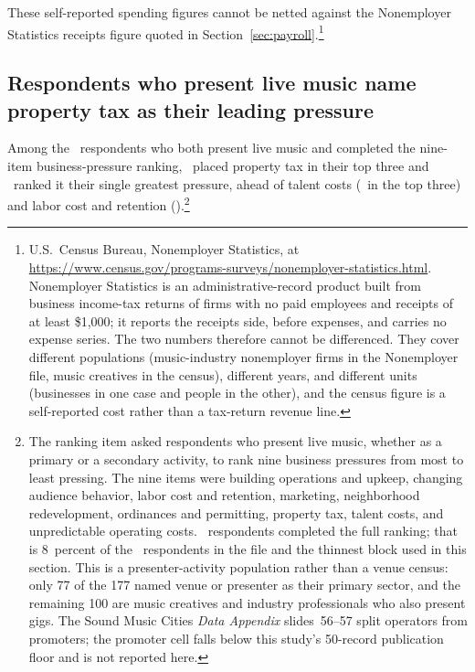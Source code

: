 These self-reported spending figures cannot be netted against the
Nonemployer Statistics receipts figure quoted in
Section~\ref{sec:payroll}.\footnote{U.S.~Census Bureau, Nonemployer
Statistics, at
\url{https://www.census.gov/programs-surveys/nonemployer-statistics.html}.
Nonemployer Statistics is an administrative-record product built from
business income-tax returns of firms with no paid employees and receipts of
at least \$1{,}000; it reports the receipts side, before expenses, and
carries no expense series. The two numbers therefore cannot be differenced.
They cover different populations (music-industry nonemployer firms in the
Nonemployer file, music creatives in the census), different years, and
different units (businesses in one case and people in the other), and the
census figure is a self-reported cost rather than a tax-return revenue
line.}

\subsection{Respondents who present live music name property tax as their leading pressure}

Among the \NCensusNPresentersRanking\ respondents who both present live music
and completed the nine-item business-pressure ranking,
\NCensusPressureTopThreePropertyTax\ placed property tax in their top three
and \NCensusPressureFirstPropertyTax\ ranked it their single greatest
pressure, ahead of talent costs (\NCensusPressureTopThreeTalentCosts\ in the
top three) and labor cost and retention
(\NCensusPressureTopThreeLaborCostAndRetention).\footnote{The ranking item
asked respondents who present live music, whether as a primary or a
secondary activity, to rank nine business pressures from most to least
pressing. The nine items were building operations and upkeep, changing
audience behavior, labor cost and retention, marketing, neighborhood
redevelopment, ordinances and permitting, property tax, talent costs, and
unpredictable operating costs. \NCensusNPresentersRanking\ respondents
completed the full ranking; that is 8~percent of the \NCensusNRespondents\
respondents in the file and the thinnest block used in this section. This is
a presenter-activity population rather than a venue census: only 77 of the
177 named venue or presenter as their primary sector, and the remaining 100
are music creatives and industry professionals who also present gigs. The
Sound Music Cities \textit{Data Appendix} slides~56--57 split operators from
promoters; the promoter cell falls below this study's 50-record publication
floor and is not reported here.}

